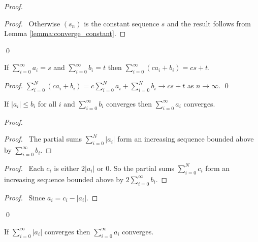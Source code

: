 \begin{proof}
    \pf
    \begin{proof}
        \pf\ Otherwise $(s_n)$ is the constant sequence $s$ and the result follows from Lemma \ref{lemma:converge_constant}.
    \end{proof}
    \step{3}{\pick{$a < s$ such that $(a,s] \subseteq U$}}
    \step{5}{For all $n \geq N$ we have $a_n \in (a,s]$}
    \qed
\end{proof}

\begin{theorem}
    If $\sum_{i=0}^\infty a_i = s$ and $\sum_{i=0}^\infty b_i = t$ then $\sum_{i=0}^\infty (ca_i + b_i) = cs+t$.
\end{theorem}

\begin{proof}
    \pf $\sum_{i=0}^N (ca_i + b_i) = c \sum_{i=0}^N a_i + \sum_{i=0}^N b_i \rightarrow cs+t$ as $n \rightarrow \infty$. \qed
\end{proof}

\begin{theorem}
    If $|a_i| \leq b_i$ for all $i$ and $\sum_{i=0}^\infty b_i$ converges then $\sum_{i=0}^\infty a_i$ converges.
\end{theorem}

\begin{proof}
    \pf
    \begin{proof}
        \pf\ The partial sums $\sum_{i=0}^N |a_i|$ form an increasing sequence bounded above by $\sum_{i=0}^\infty b_i$.
    \end{proof}
    \begin{proof}
        \pf\ Each $c_i$ is either $2|a_i|$ or 0. So the partial sums $\sum_{i=0}^N c_i$ form an increasing sequence bounded above by $2 \sum_{i=0}^\infty b_i$.
    \end{proof}
    \qedstep
    \begin{proof}
        \pf\ Since $a_i = c_i - |a_i|$.
    \end{proof}
    \qed
\end{proof}

\begin{corollary}
    If $\sum_{i=0}^\infty |a_i|$ converges then $\sum_{i=0}^\infty a_i$ converges.
\end{corollary}

